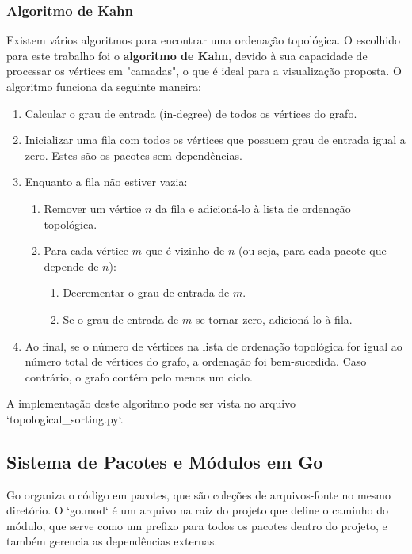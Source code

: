 \documentclass[12pt]{article}
\begin{document}
\subsubsection{Algoritmo de Kahn}
Existem vários algoritmos para encontrar uma ordenação topológica. O escolhido para este trabalho foi o \textbf{algoritmo de Kahn}, devido à sua capacidade de processar os vértices em "camadas", o que é ideal para a visualização proposta. O algoritmo funciona da seguinte maneira:
\begin{enumerate}
    \item Calcular o grau de entrada (in-degree) de todos os vértices do grafo.
    \item Inicializar uma fila com todos os vértices que possuem grau de entrada igual a zero. Estes são os pacotes sem dependências.
    \item Enquanto a fila não estiver vazia:
    \begin{enumerate}
        \item Remover um vértice $n$ da fila e adicioná-lo à lista de ordenação topológica.
        \item Para cada vértice $m$ que é vizinho de $n$ (ou seja, para cada pacote que depende de $n$):
        \begin{enumerate}
            \item Decrementar o grau de entrada de $m$.
            \item Se o grau de entrada de $m$ se tornar zero, adicioná-lo à fila.
        \end{enumerate}
    \end{enumerate}
    \item Ao final, se o número de vértices na lista de ordenação topológica for igual ao número total de vértices do grafo, a ordenação foi bem-sucedida. Caso contrário, o grafo contém pelo menos um ciclo.
\end{enumerate}
A implementação deste algoritmo pode ser vista no arquivo `topological{\_}sorting.py`.

\subsection{Sistema de Pacotes e Módulos em Go}
Go organiza o código em pacotes, que são coleções de arquivos-fonte no mesmo diretório. O `go.mod` é um arquivo na raiz do projeto que define o caminho do módulo, que serve como um prefixo para todos os pacotes dentro do projeto, e também gerencia as dependências externas.
\end{document}
